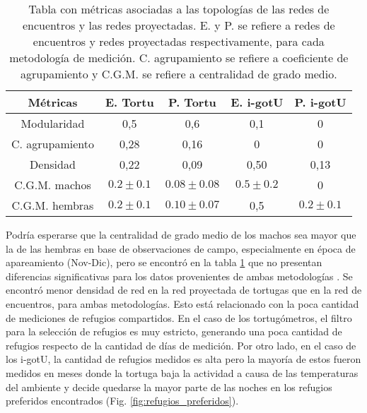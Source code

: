 \begin{table}[ht]
    \centering
    \begin{tabular}{|c|c|c|c|c|}
    \hline
    Métricas          & E. Tortu   & P. Tortu      & E. i-gotU   & P. i-gotU    \\ \hline
    Modularidad       & 0,5         & 0,6           & 0,1        & 0            \\ \hline
    C. agrupamiento & 0,28        & 0,16          & 0           & 0            \\ \hline
    Densidad          & 0,22        & 0,09          & 0,50         & 0,13          \\ \hline
    C.G.M. machos     & $0.2\pm0.1$ & $0.08\pm0.08$ & $0.5\pm0.2$ & 0            \\ \hline
    C.G.M. hembras    & $0.2\pm0.1$ & $0.10\pm0.07$ & 0,5         & $0.2\pm0.1 $ \\ \hline
    \end{tabular}
    \caption[Tabla con métricas asociadas a las tipologías de las redes de encuentros y las redes proyectadas.]{Tabla con métricas asociadas a las topologías de las redes de encuentros y las redes proyectadas. E. y P. se refiere a redes de encuentros y redes proyectadas respectivamente, para cada metodología de medición. C. agrupamiento se refiere a coeficiente de agrupamiento y C.G.M. se refiere a centralidad de grado medio.}
    \label{tab:metricas_topologia_redes}
\end{table}
Podría esperarse que la centralidad de grado medio de los machos sea mayor que la de las hembras en base de observaciones de campo, especialmente en época de apareamiento (Nov-Dic), pero se encontró en la tabla \ref{tab:metricas_topologia_redes} que no presentan diferencias significativas para los datos provenientes de ambas metodologías \cite{Erika}. Se encontró menor densidad de red en la red proyectada de tortugas que en la red de encuentros, para ambas metodologías. Esto está relacionado con la poca cantidad de mediciones de refugios compartidos. En el caso de los tortugómetros, el filtro para la selección de refugios es muy estricto, generando una poca cantidad de refugios respecto de la cantidad de días de medición. Por otro lado, en el caso de los i-gotU, la cantidad de refugios medidos es alta pero la mayoría de estos fueron medidos en meses donde la tortuga baja la actividad a causa de las temperaturas del ambiente y decide quedarse la mayor parte de las noches en los refugios preferidos encontrados (Fig. \ref{fig:refugios_preferidos}).
 
